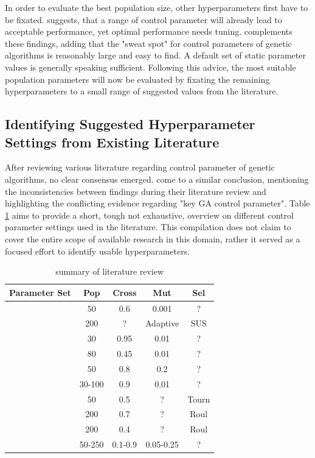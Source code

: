 In order to evaluate the best population size, other hyperparameters first have to be fixated.
\cite{grefenstette_optimization_1986} suggests, that a range of control parameter will already lead to acceptable performance, yet optimal performance needs tuning. \cite{kacprzyk_parameter_2007} complements these findings, adding that the "sweat spot" for control parameters of genetic algorithms is reasonably large and easy to find. A default set of static parameter values is generally speaking sufficient. Following this advice, the most suitable population parameters will now be evaluated by fixating the remaining hyperparameters to a small range of suggested values from the literature.

\subsection{Identifying Suggested Hyperparameter Settings from Existing Literature}
After reviewing various literature regarding control parameter of genetic algorithms, no clear consensus emerged. \cite{mills_determining_2015} come to a similar conclusion, mentioning the inconsistencies between findings during their literature review and highlighting the conflicting evidence regarding "key GA control parameter". Table \ref{tab:hyperparameter_tuning:ga_hyperparameters} aims to provide a short, tough not exhaustive, overview on different control parameter settings used in the literature. This compilation does not claim to cover the entire scope of available research in this domain, rather it served as a focused effort to identify usable hyperparameters.

\begin{table}[ht]
	\centering
	\begin{tabular}{lcccc}
		\hline
		\textbf{Parameter Set} & \textbf{Pop} & \textbf{Cross} & \textbf{Mut} & \textbf{Sel} \\
		\hline
		\cite{de_jong_analysis_1975} & 50 & 0.6 & 0.001 & ? \\
		\cite{mills_determining_2015} & 200 & ? & Adaptive & SUS\\
		\cite{grefenstette_optimization_1986} & 30 & 0.95 & 0.01 & ?\\
		\cite{grefenstette_optimization_1986} & 80 & 0.45 & 0.01 & ?\\
		\cite{almanee_scenorita_2021} & 50 & 0.8 & 0.2 & ?\\
		\cite{srinivas_genetic_1994}  & 30-100 & 0.9 & 0.01 & ?\\
		\cite{fazal_estimating_2005} & 50 & 0.5 & ? & Tourn\\
		\cite{dao_maximising_2016} & 200 & 0.7 & ? & Roul\\
		\cite{naruka_parameter_2019} & 200 & 0.4 & ? & Roul \\
		\cite{jinghui_zhong_comparison_2005} & 50-250 & 0.1-0.9 & 0.05-0.25 & ?\\
		\hline
	\end{tabular}
	\caption{summary of literature review}
	\label{tab:hyperparameter_tuning:ga_hyperparameters}
\end{table}

